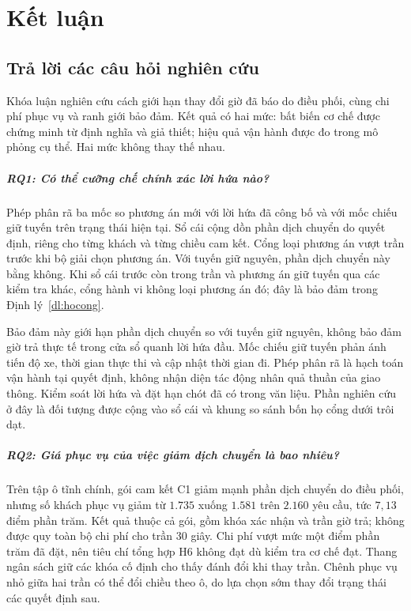 ﻿\chapter{Kết luận}

\section{Trả lời các câu hỏi nghiên cứu}

Khóa luận nghiên cứu cách giới hạn thay đổi giờ đã báo do điều phối, cùng chi phí phục vụ
và ranh giới bảo đảm. Kết quả có hai mức: bất biến cơ chế được chứng minh từ định nghĩa và
giả thiết; hiệu quả vận hành được đo trong mô phỏng cụ thể. Hai mức không thay thế nhau.

\paragraph{RQ1: Có thể cưỡng chế chính xác lời hứa nào?}
Phép phân rã ba mốc so phương án mới với lời hứa đã công bố và với mốc chiếu giữ tuyến
trên trạng thái hiện tại. Sổ cái cộng dồn phần dịch chuyển do quyết định, riêng cho
từng khách và từng chiều cam kết. Cổng loại phương án vượt trần trước khi bộ giải chọn
phương án. Với tuyến giữ nguyên, phần dịch chuyển này bằng không. Khi sổ cái trước còn
trong trần và phương án giữ tuyến qua các kiểm tra khác, cổng hành vi không loại phương án
đó; đây là bảo đảm trong Định lý~\ref{dl:hocong}.

Bảo đảm này giới hạn phần dịch chuyển so với tuyến giữ nguyên, không bảo đảm giờ trả
thực tế trong cửa sổ quanh lời hứa đầu. Mốc chiếu giữ tuyến phản ánh tiến độ xe, thời gian
thực thi và cập nhật thời gian đi. Phép phân rã là hạch toán vận hành tại quyết định,
không nhận diện tác động nhân quả thuần của giao thông. Kiểm soát lời hứa và đặt hạn chót
đã có trong văn liệu. Phần nghiên cứu ở đây là đối tượng được cộng vào sổ cái và khung
so sánh bốn họ cổng dưới trôi dạt.

\paragraph{RQ2: Giá phục vụ của việc giảm dịch chuyển là bao nhiêu?}
Trên tập ô tĩnh chính, gói cam kết C1 giảm mạnh phần dịch chuyển do điều phối, nhưng số
khách phục vụ giảm từ $1.735$ xuống $1.581$ trên $2.160$ yêu cầu, tức $7{,}13$ điểm phần
trăm. Kết quả thuộc cả gói, gồm khóa xác nhận và trần giờ trả; không được quy toàn bộ chi
phí cho trần 30 giây. Chi phí vượt mức một điểm phần trăm đã đặt, nên tiêu chí tổng hợp H6
không đạt dù kiểm tra cơ chế đạt. Thang ngân sách giữ các khóa cố định cho thấy đánh đổi
khi thay trần. Chênh phục vụ nhỏ giữa hai trần có thể đổi chiều theo ô, do lựa chọn sớm
thay đổi trạng thái các quyết định sau.

